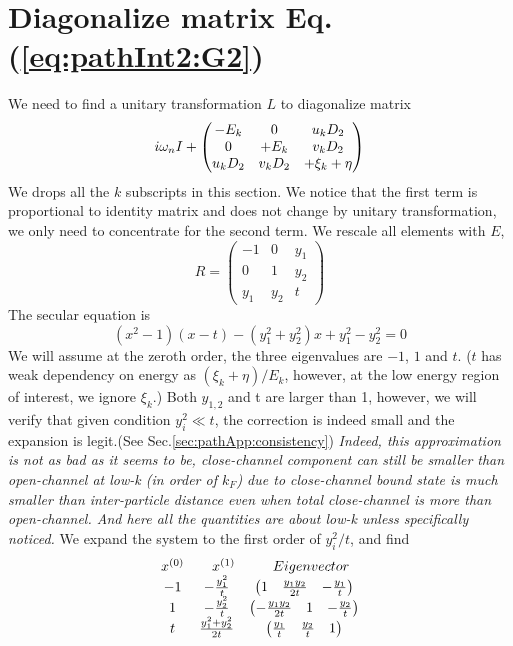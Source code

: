 

\section{Diagonalize matrix Eq. (\ref{eq:pathInt2:G2})\label{sec:diagonalize}}
We need to find a unitary transformation $L$ to diagonalize matrix 
\begin{equation*}
i\omega_{n}I+\begin{pmatrix}-E_k&0&u _kD_2\\0&+E_k&v_kD_2\\u_kD_2&v_kD_2&+\xi_k+\eta\end{pmatrix}
\end{equation*}
We drops all the $k$ subscripts in this section.  We notice that the first term is proportional to identity matrix and does not change by unitary transformation, we only need to concentrate for the second term.  We rescale all elements with $E$, 
\begin{equation*}
R=
\begin{pmatrix}
-1&0&y_1\\
0&1&y_2\\
y_1&y_2&t
\end{pmatrix}
\end{equation*}
The secular equation is 
\begin{equation}\label{eq:pahtApp:secular}
(x^{2}-1)(x-t)-(y_{1}^{2}+y_{2}^{2})x+y_{1}^{2}-y_{2}^{2}=0
\end{equation}
We will assume at the zeroth order, the three eigenvalues are $-1$, $1$ and $t$.  ($t$ has weak dependency on energy as $(\xi_{k}+\eta)/E_{k}$, however, at the low energy region of interest, we ignore $\xi_{k}$.) Both $y_{1,2}$ and t are larger than 1, however, we will verify that given condition $y_{i}^{2}\ll{t}$, the correction is indeed small and the expansion is legit.(See Sec.\ref{sec:pathApp:consistency})  \emph{Indeed, this approximation is not as bad as it seems to be, close-channel component can still be smaller than open-channel at low-k (in order of $k_{F}$)  due to close-channel bound state is much smaller than inter-particle distance even when total close-channel is more than open-channel.  And here all the quantities are about low-k unless specifically noticed.} 
We expand the system to the first order of $y_{i}^{2}/{t}$, and find
\begin{equation}
\begin{array}{ccc}
x^{(0)}&\quad{}x^{(1)}&\quad{}Eigenvector\nonumber\\
-1&-\frac{y_{1}^{2}}{t}&\begin{pmatrix}1&\frac{y_{1}y_{2}}{2t}&-\frac{y_{1}}{t}\end{pmatrix}\\
1&-\frac{y_{2}^{2}}{t}&\begin{pmatrix}-\frac{y_{1}y_{2}}{2t}&1&-\frac{y_{2}}{t}\end{pmatrix}\\
t&\frac{y_{1}^{2}+y_{2}^{2}}{2t}&\begin{pmatrix}\frac{y_{1}}{t}&\frac{y_{2}}{t}&1\end{pmatrix}
\end{array}
\end{equation}
